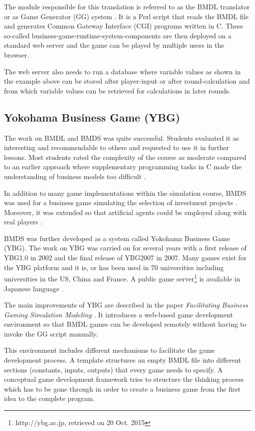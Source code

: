 The module responsible for this translation is referred to as the BMDL translator \cite{bmdl3, bmdl2, bmdl1} or as Game Generator (GG) system \cite{ybg1}. It is a Perl script that reads the BMDL file and generates Common Gateway Interface (CGI) programs written in C. These so-called business-game-runtime-system-components are then deployed on a standard web server and the game can be played by multiple users in the browser. 

The web server also needs to run a database where variable values as shown in the example above can be stored after player-input or after round-calculation and from which variable values can be retrieved for calculations in later rounds.

\subsection{Yokohama Business Game (YBG)}
\label{subsec:ybg}

The work on BMDL and BMDS was quite successful. Students evaluated it as interesting and recommendable to others and requested to use it in further lessons. Most students rated the complexity of the course as moderate compared to an earlier approach where supplementary programming tasks in C made the understanding of business models too difficult \cite{bmdl3, bmdl2, bmdl1}.

In addition to many game implementations within the simulation course, BMDS was used for a business game simulating the selection of investment projects \cite{bmdsinvest}. Moreover, it was extended so that artificial agents could be employed along with real players \cite{bmdsagent1, bmdsagent2}.  

BMDS was further developed as a system called Yokohama Business Game (YBG). The work on YBG was carried on for several years with a first release of YBG1.0 in 2002 and the final release of YBG2007 in 2007. Many games exist for the YBG platform and it is, or has been used in 70 universities including universities in the US, China and France. A public game server\footnote{http://ybg.ac.jp, retrieved on 20 Oct. 2015} is available in Japanese language \cite{ybg1, ybg2}.

The main improvements of YBG are described in the paper \textit{Facilitating Business Gaming Simulation Modeling} \cite{ybg1}. It introduces a web-based game development environment so that BMDL games can be developed remotely without having to invoke the GG script manually. 

This environment includes different mechanisms to facilitate the game development process. A template structures an empty BMDL file into different sections (constants, inputs, outputs) that every game needs to specify. A conceptual game development framework tries to structure the thinking process which has to be gone through in order to create a business game from the first idea to the complete program. 

